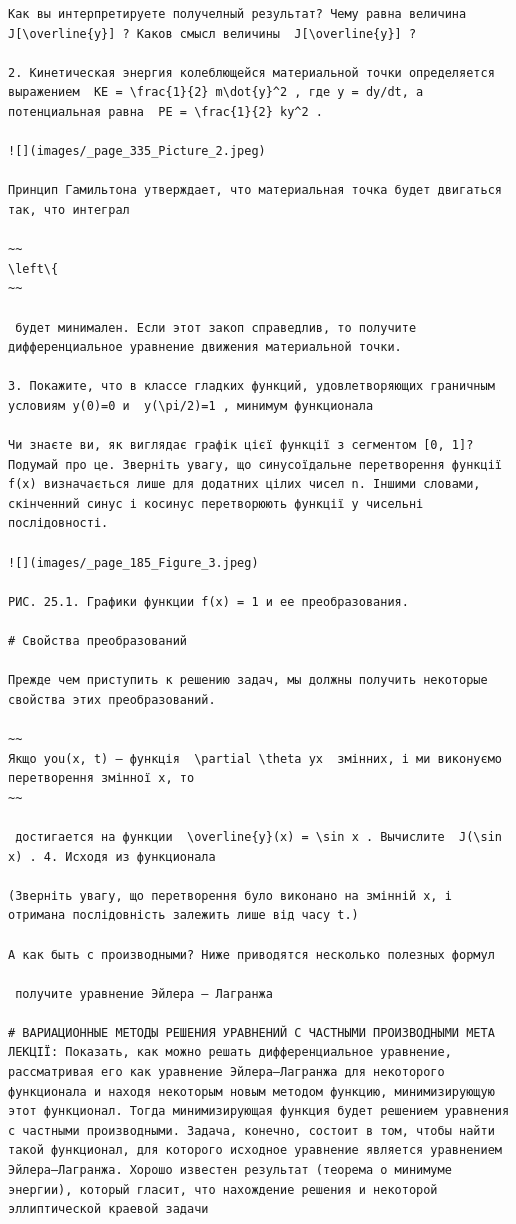 \documentclass[
  ukrainian,
]{article}
\begin{document}
\begin{verbatim}
Как вы интерпретируете получелный результат? Чему равна величина  J[\overline{y}] ? Каков смысл величины  J[\overline{y}] ?

2. Кинетическая энергия колеблющейся материальной точки определяется выражением  KE = \frac{1}{2} m\dot{y}^2 , где y = dy/dt, а потенциальная равна  PE = \frac{1}{2} ky^2 .

![](images/_page_335_Picture_2.jpeg)

Принцип Гамильтона утверждает, что материальная точка будет двигаться так, что интеграл

~~
\left\{
~~

 будет минимален. Если этот закоп справедлив, то получите дифференциальное уравнение движения материальной точки.

3. Покажите, что в классе гладких функций, удовлетворяющих граничным условиям y(0)=0 и  y(\pi/2)=1 , минимум функционала

Чи знаєте ви, як виглядає графік цієї функції з сегментом [0, 1]? Подумай про це. Зверніть увагу, що синусоїдальне перетворення функції f(x) визначається лише для додатних цілих чисел n. Іншими словами, скінченний синус і косинус перетворюють функції у чисельні послідовності.

![](images/_page_185_Figure_3.jpeg)

РИС. 25.1. Графики функции f(x) = 1 и ее преобразования.

# Свойства преобразований

Прежде чем приступить к решению задач, мы должны получить некоторые свойства этих преобразований.

~~
Якщо you(x, t) — функція  \partial \theta yx  змінних, і ми виконуємо перетворення змінної x, то
~~

 достигается на функции  \overline{y}(x) = \sin x . Вычислите  J(\sin x) . 4. Исходя из функционала

(Зверніть увагу, що перетворення було виконано на змінній x, і отримана послідовність залежить лише від часу t.)

А как быть с производными? Ниже приводятся несколько полезных формул

 получите уравнение Эйлера — Лагранжа

# ВАРИАЦИОННЫЕ МЕТОДЫ РЕШЕНИЯ УРАВНЕНИЙ С ЧАСТНЫМИ ПРОИЗВОДНЫМИ МЕТА ЛЕКЦІЇ: Показать, как можно решать дифференциальное уравнение, рассматривая его как уравнение Эйлера—Лагранжа для некоторого функционала и находя некоторым новым методом функцию, минимизирующую этот функционал. Тогда минимизирующая функция будет решением уравнения с частными производными. Задача, конечно, состоит в том, чтобы найти такой функционал, для которого исходное уравнение является уравнением Эйлера—Лагранжа. Хорошо известен результат (теорема о минимуме энергии), который гласит, что нахождение решения и некоторой эллиптической краевой задачи
\end{verbatim}
\end{document}
